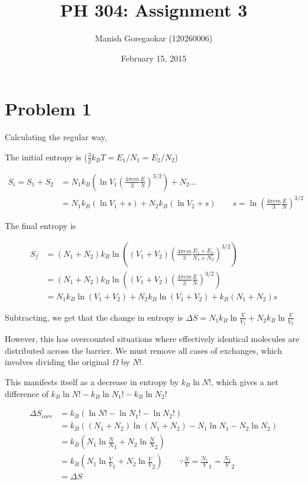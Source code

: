 \documentclass[12pt]{article}
\title{PH 304: Assignment 3}
\author{Manish Goregaokar (120260006)}
\date{February 15, 2015}
\begin{document}
\maketitle

\section*{Problem 1}
Calculating the regular way,

The initial entropy is ($\frac32 k_B T=E_1/N_1=E_2/N_2$)

\begin{align*}
S_i = S_1 + S_2 &= N_1k_B\left(\ln V_1\left(\frac{4\pi em}{3}\frac E N\right)^{3/2}\right) + N_2 \dots\\
&= N_1k_B(\ln V_1 + s) + N_2k_B(\ln V_2 + s) \qquad s = \ln \left(\frac{4\pi em}{3}\frac E N\right)^{3/2}
\end{align*}

The final entropy is 

\begin{align*}
S_f  &=  (N_1+N_2)k_B\ln\left((V_1+V_2)\left(\frac{4\pi em}{3}\frac{E_1+E_2}{N_1+N_2}\right)^{3/2}\right)\\
 &=  (N_1+N_2)k_B\ln\left((V_1+V_2)\left(\frac{4\pi em}{3}\frac E N\right)^{3/2}\right)\\
 &=N_1 k_B\ln(V_1 +V_2) + N_2 k_B \ln (V_1 + V_2) + k_B(N_1 +N_2)s
\end{align*}


Subtracting, we get that the change in entropy is $\Delta S = N_1k_B\ln\frac{V}{V_1}+ N_2k_B\ln\frac{V}{V_2}$

However, this has overcounted situations where effectively identical molecules are distributed across the barrier. We must remove all cases of exchanges, which involves dividing the original $\Omega$ by $N!$.

This manifests itself as a decrease in entropy by $k_B\ln N!$, which gives a net difference of $k_B\ln N!-k_B\ln N_1!-k_B\ln N_2!$

\begin{align*}
\Delta S_{corr} &= k_B(\ln N!-\ln N_1!-\ln N_2!)\\
&= k_B ((N_1+N_2)\ln (N_1+N_2) - N_1\ln N_1 -N_2\ln N_2)\\
&= k_B (N_1\ln\frac N N_1 +N_2\ln\frac N N_2 )\\
&= k_B (N_1\ln\frac V V_1 +N_2\ln\frac V V_2 )\qquad\because \frac N V = \frac{N_1} V_1 = \frac{N_2} V_2\\
&= \Delta S
\end{align*}
\end{document}
